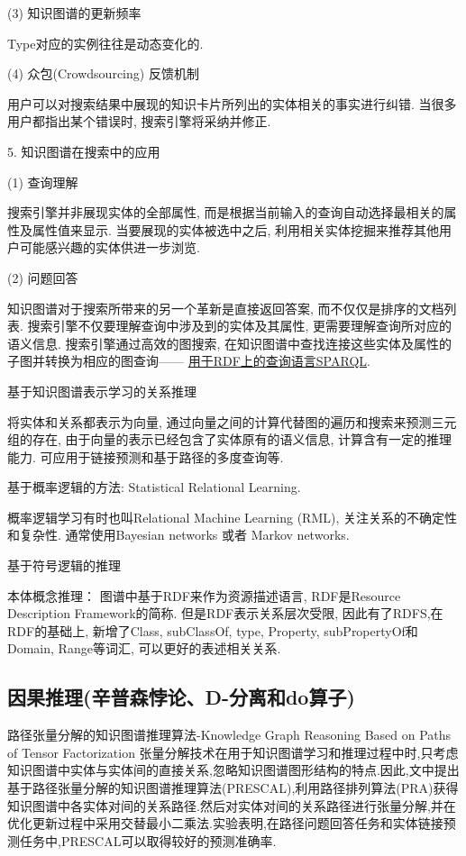 (3) 知识图谱的更新频率

Type对应的实例往往是动态变化的.

(4) 众包(Crowdsourcing) 反馈机制

用户可以对搜索结果中展现的知识卡片所列出的实体相关的事实进行纠错. 当很多用户都指出某个错误时, 搜索引擎将采纳并修正.

5. 知识图谱在搜索中的应用

(1) 查询理解

搜索引擎并非展现实体的全部属性, 而是根据当前输入的查询自动选择最相关的属性及属性值来显示. 当要展现的实体被选中之后, 利用相关实体挖掘来推荐其他用户可能感兴趣的实体供进一步浏览.

(2)  问题回答

知识图谱对于搜索所带来的另一个革新是直接返回答案, 而不仅仅是排序的文档列表.
搜索引擎不仅要理解查询中涉及到的实体及其属性, 更需要理解查询所对应的语义信息. 搜索引擎通过高效的图搜索, 在知识图谱中查找连接这些实体及属性的子图并转换为相应的图查询——
\href{https://www.w3.org/TR/rdf-sparql-query/}{用于RDF上的查询语言SPARQL}.

 基于知识图谱表示学习的关系推理

将实体和关系都表示为向量, 通过向量之间的计算代替图的遍历和搜索来预测三元组的存在, 由于向量的表示已经包含了实体原有的语义信息, 计算含有⼀定的推理能⼒. 可应⽤于链接预测和基于路径的多度查询等.

 基于概率逻辑的方法: Statistical Relational Learning.

概率逻辑学习有时也叫Relational Machine Learning (RML), 关注关系的不确定性和复杂性.
通常使用Bayesian networks 或者 Markov networks.

 基于符号逻辑的推理

本体概念推理： 图谱中基于RDF来作为资源描述语言, RDF是Resource Description Framework的简称.
但是RDF表示关系层次受限, 因此有了RDFS,在RDF的基础上, 新增了Class, subClassOf, type, Property, subPropertyOf和Domain, Range等词汇, 可以更好的表述相关关系.
\subsection{因果推理(辛普森悖论、D-分离和do算子)}

路径张量分解的知识图谱推理算法-Knowledge Graph Reasoning Based on Paths of Tensor Factorization
张量分解技术在用于知识图谱学习和推理过程中时,只考虑知识图谱中实体与实体间的直接关系,忽略知识图谱图形结构的特点.因此,文中提出基于路径张量分解的知识图谱推理算法(PRESCAL),利用路径排列算法(PRA)获得知识图谱中各实体对间的关系路径.然后对实体对间的关系路径进行张量分解,并在优化更新过程中采用交替最小二乘法.实验表明,在路径问题回答任务和实体链接预测任务中,PRESCAL可以取得较好的预测准确率.
